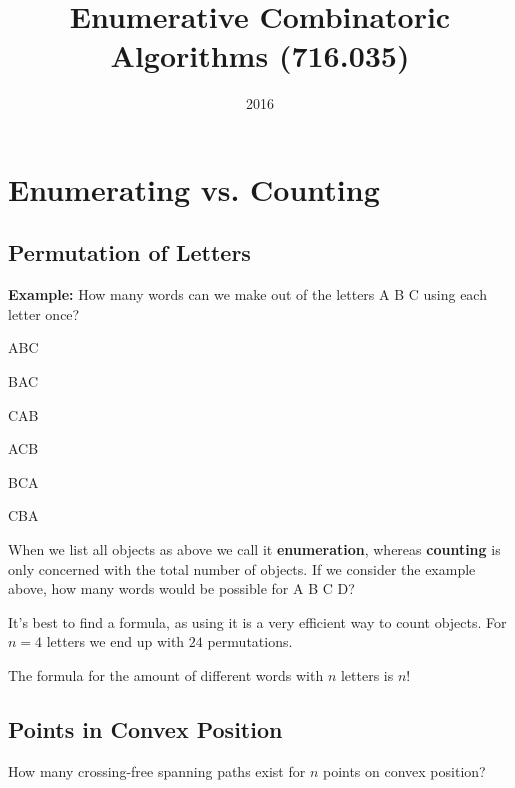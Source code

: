 \documentclass[12pt,onecolumn%
]{scrartcl}
\title{Enumerative Combinatoric Algorithms (716.035)}
\date{2016}
\newcommand{\newsection}[1]{
\cleardoublepage
\section{#1}
}
\begin{document}
\begin{titlepage}
\maketitle
\newpage
\pagestyle{index-style}
\tableofcontents{}
\newpage
\end{titlepage}


\pagestyle{eca-style}

\newsection{Enumerating vs. Counting}

\subsection{Permutation of Letters}

{\bf Example:} How many words can we make out of the letters A B C using each letter once?

\begin{center}
\begin{inparaitem}
	\item ABC \qquad
	\item BAC \qquad
	\item CAB
\end{inparaitem}

\begin{inparaitem}
	\item ACB \qquad
	\item BCA \qquad
	\item CBA
\end{inparaitem}
\end{center}

When we list all objects as above we call it {\bf enumeration}, whereas {\bf counting} is only concerned with the total number of objects. If we consider the example above, how many words would be possible for A B C D?

It's best to find a formula, as using it is a very efficient way to count objects. For $n = 4$ letters we end up with $24$ permutations.

The formula for the amount of different words with $n$ letters is $n!$

\subsection{Points in Convex Position}

How many crossing-free spanning paths exist for $n$ points on convex position?
\end{document}
